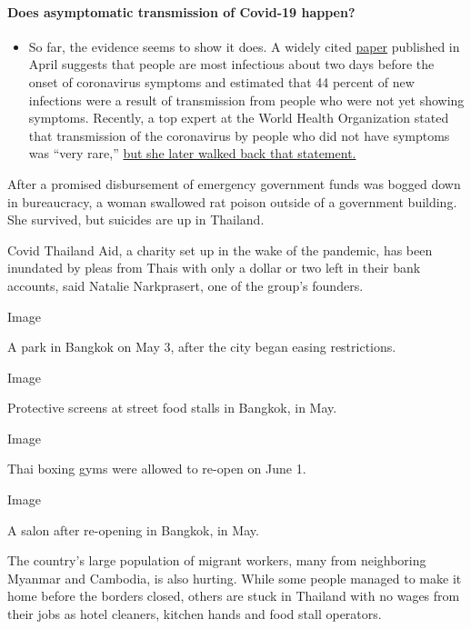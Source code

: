 \begin{itemize}
{  \paragraph{Does asymptomatic transmission of Covid-19
  happen?}\label{does-asymptomatic-transmission-of-covid-19-happen}}

  \begin{itemize}
  \tightlist
  \item
    So far, the evidence seems to show it does. A widely cited
    \href{https://www.nature.com/articles/s41591-020-0869-5}{paper}
    published in April suggests that people are most infectious about
    two days before the onset of coronavirus symptoms and estimated that
    44 percent of new infections were a result of transmission from
    people who were not yet showing symptoms. Recently, a top expert at
    the World Health Organization stated that transmission of the
    coronavirus by people who did not have symptoms was ``very rare,''
    \href{https://www.nytimes3xbfgragh.onion/2020/06/09/world/coronavirus-updates.html?action=click\&pgtype=Article\&state=default\&region=MAIN_CONTENT_3\&context=storylines_faq\#link-1f302e21}{but
    she later walked back that statement.}
  \end{itemize}
\end{itemize}

After a promised disbursement of emergency government funds was bogged
down in bureaucracy, a woman swallowed rat poison outside of a
government building. She survived, but suicides are up in Thailand.

Covid Thailand Aid, a charity set up in the wake of the pandemic, has
been inundated by pleas from Thais with only a dollar or two left in
their bank accounts, said Natalie Narkprasert, one of the group's
founders.

Image

A park in Bangkok on May 3, after the city began easing restrictions.

Image

Protective screens at street food stalls in Bangkok, in May.

Image

Thai boxing gyms were allowed to re-open on June 1.

Image

A salon after re-opening in Bangkok, in May.

The country's large population of migrant workers, many from neighboring
Myanmar and Cambodia, is also hurting. While some people managed to make
it home before the borders closed, others are stuck in Thailand with no
wages from their jobs as hotel cleaners, kitchen hands and food stall
operators.

